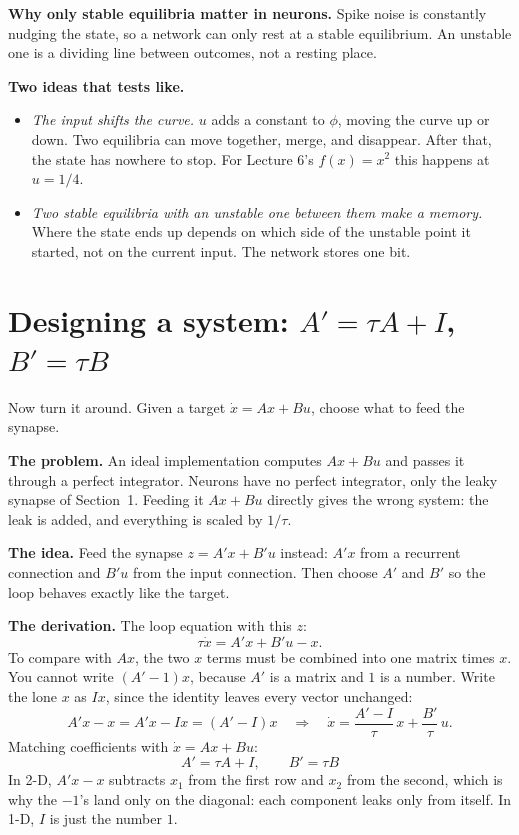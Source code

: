 \documentclass[11pt,letterpaper]{article}
\begin{document}
\textbf{Why only stable equilibria matter in neurons.} Spike noise is constantly nudging the state, so a network can only rest at a stable equilibrium. An unstable one is a dividing line between outcomes, not a resting place.

\textbf{Two ideas that tests like.}
\begin{itemize}
\item \emph{The input shifts the curve.} $u$ adds a constant to $\phi$, moving the curve up or down. Two equilibria can move together, merge, and disappear. After that, the state has nowhere to stop. For Lecture 6's $f(x) = x^2$ this happens at $u = 1/4$.
\item \emph{Two stable equilibria with an unstable one between them make a memory.} Where the state ends up depends on which side of the unstable point it started, not on the current input. The network stores one bit.
\end{itemize}

\section{Designing a system: $A' = \tau A + I$, $B' = \tau B$}

Now turn it around. Given a target $\dot x = Ax + Bu$, choose what to feed the synapse.

\textbf{The problem.} An ideal implementation computes $Ax + Bu$ and passes it through a perfect integrator. Neurons have no perfect integrator, only the leaky synapse of Section~1. Feeding it $Ax + Bu$ directly gives the wrong system: the leak is added, and everything is scaled by $1/\tau$.

\textbf{The idea.} Feed the synapse $z = A'x + B'u$ instead: $A'x$ from a recurrent connection and $B'u$ from the input connection. Then choose $A'$ and $B'$ so the loop behaves exactly like the target.

\textbf{The derivation.} The loop equation with this $z$:
\[
\tau\dot x = A'x + B'u - x .
\]
To compare with $Ax$, the two $x$ terms must be combined into one matrix times $x$. You cannot write $(A' - 1)x$, because $A'$ is a matrix and $1$ is a number. Write the lone $x$ as $Ix$, since the identity leaves every vector unchanged:
\[
A'x - x = A'x - Ix = (A' - I)x \quad\Longrightarrow\quad \dot x = \frac{A' - I}{\tau}\,x + \frac{B'}{\tau}\,u .
\]
Matching coefficients with $\dot x = Ax + Bu$:
\[
\boxed{\ A' = \tau A + I, \qquad B' = \tau B\ }
\]
In 2-D, $A'x - x$ subtracts $x_1$ from the first row and $x_2$ from the second, which is why the $-1$'s land only on the diagonal: each component leaks only from itself. In 1-D, $I$ is just the number $1$.
\end{document}
